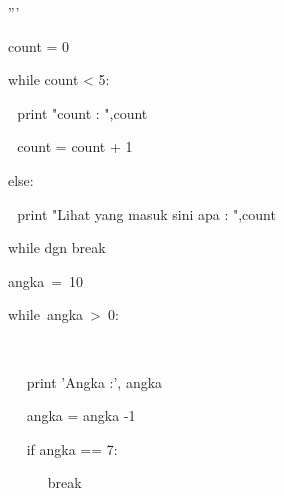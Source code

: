 ''' \par
count = 0 \par
while count < 5: \par
 $  $  $  $  $  $print "count : ",count \par
 $  $  $  $  $  $count = count + 1 \par
else: \par
 $  $  $  $ print "Lihat yang masuk sini apa : ",count \par
\vspace{12pt}
while dgn break \par
angka~=~10~~~~~~    \par
while~angka~>~0:~~~~~~~~~~     \par
~~  \par
~~ print 'Angka :', angka \par
~~ angka = angka -1 \par
~~ if angka == 7: \par
~~~~~ break \par
\vspace{\baselineskip}
\vspace{12pt}
\vspace{12pt}
